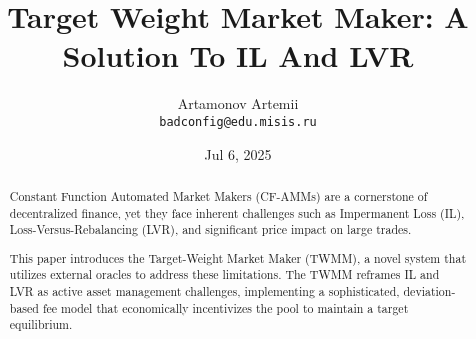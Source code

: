 \documentclass{article}
\title{Target Weight Market Maker: A Solution To IL And LVR}
\author{Artamonov Artemii \\
	\texttt{badconfig@edu.misis.ru}}
\date{Jul 6, 2025}
\begin{document}
\maketitle

\begin{abstract}
Constant Function Automated Market Makers (CF-AMMs) are a cornerstone of decentralized finance, yet they face inherent challenges such as Impermanent Loss (IL), Loss-Versus-Rebalancing (LVR), and significant price impact on large trades.

This paper introduces the Target-Weight Market Maker (TWMM), a novel system that utilizes external oracles to address these limitations. The TWMM reframes IL and LVR as active asset management challenges, implementing a sophisticated, deviation-based fee model that economically incentivizes the pool to maintain a target equilibrium.
\end{abstract}

\tableofcontents


\pagebreak

\pagebreak





\pagebreak


\end{document}
